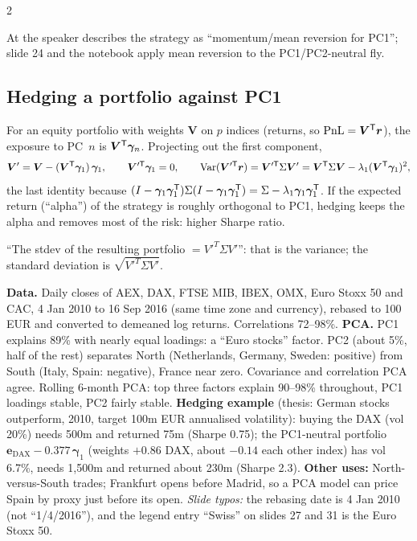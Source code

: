 \begin{paracol}{2}
\begin{coursenote}
At  the speaker describes the strategy as ``momentum/mean reversion for PC1''; slide 24 and the
notebook apply mean reversion to the PC1/PC2-neutral fly.
\end{coursenote}

\subsection{Hedging a portfolio against PC1}
For an equity portfolio with weights $\bm V$ on $p$ indices (returns, so $\mathrm{PnL}=\bm V^{\mathsf T}\bm r$), the exposure to
PC~$n$ is $\bm V^{\mathsf T}\bm\gamma_n$. Projecting out the first component,
\[
  \bm V'=\bm V-(\bm V^{\mathsf T}\bm\gamma_1)\,\bm\gamma_1,\qquad \bm V'^{\mathsf T}\bm\gamma_1=0,\qquad
  \operatorname{Var}(\bm V'^{\mathsf T}\bm r)=\bm V'^{\mathsf T}\Sigma\bm V'=\bm V^{\mathsf T}\Sigma\bm V-\lambda_1(\bm V^{\mathsf T}\bm\gamma_1)^2,
\]
the last identity because $(I-\bm\gamma_1\bm\gamma_1^{\mathsf T})\Sigma(I-\bm\gamma_1\bm\gamma_1^{\mathsf T})=\Sigma-\lambda_1\bm\gamma_1\bm\gamma_1^{\mathsf T}$. If the expected return
(``alpha'') of the strategy is roughly orthogonal to PC1, hedging keeps the alpha and removes most of the
risk: higher Sharpe ratio.

\begin{coursenote}
``The stdev of the resulting portfolio $=V'^T\Sigma V'$'': that is the variance; the standard deviation is
$\sqrt{V'^T\Sigma V'}$.
\end{coursenote}

\begin{casestudy}
\textbf{Data.} Daily closes of AEX, DAX, FTSE MIB, IBEX, OMX, Euro Stoxx 50 and CAC, 4 Jan 2010 to 16 Sep 2016
(same time zone and currency), rebased to 100 EUR and converted to demeaned log returns. Correlations 72--98\%.
\textbf{PCA.} PC1 explains 89\% with nearly equal loadings: a ``Euro stocks'' factor. PC2 (about 5\%, half of the
rest) separates North (Netherlands, Germany, Sweden: positive) from South (Italy, Spain: negative), France near
zero. Covariance and correlation PCA agree. Rolling 6-month PCA: top three factors explain 90--98\% throughout,
PC1 loadings stable, PC2 fairly stable. \textbf{Hedging example} (thesis: German stocks outperform, 2010, target
100m EUR annualised volatility): buying the DAX (vol 20\%) needs 500m and returned 75m (Sharpe 0.75); the
PC1-neutral portfolio $\bm e_{\mathrm{DAX}}-0.377\,\bm\gamma_1$ (weights $+0.86$ DAX, about $-0.14$ each other index) has vol
6.7\%, needs 1{,}500m and returned about 230m (Sharpe 2.3). \textbf{Other uses:} North-versus-South trades;
Frankfurt opens before Madrid, so a PCA model can price Spain by proxy just before its open.
\emph{Slide typos:} the rebasing date is 4 Jan 2010 (not ``1/4/2016''), and the legend entry ``Swiss'' on slides 27
and 31 is the Euro Stoxx 50.
\end{casestudy}


\end{paracol}
